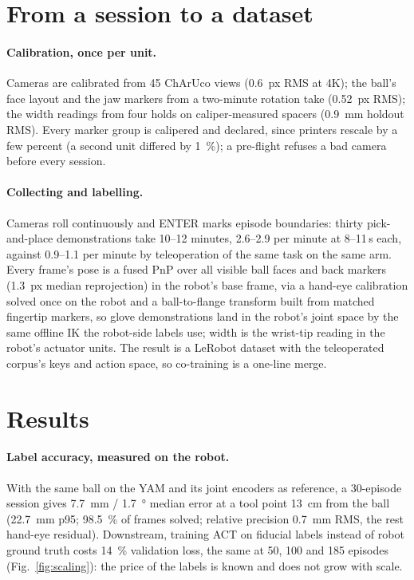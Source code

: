 \documentclass{article}
\begin{document}
\section{From a session to a dataset}
\label{sec:pipeline}
\paragraph{Calibration, once per unit.}
Cameras are calibrated from 45 ChArUco views (\SI{0.6}{px} RMS at 4K); the ball's face layout and the jaw markers from a two-minute rotation take (\SI{0.52}{px} RMS); the width readings from four holds on caliper-measured spacers (\SI{0.9}{mm} holdout RMS). Every marker group is calipered and declared, since printers rescale by a few percent (a second unit differed by \SI{1}{\percent}); a pre-flight refuses a bad camera before every session.

\paragraph{Collecting and labelling.}
Cameras roll continuously and ENTER marks episode boundaries: thirty pick-and-place demonstrations take 10--12 minutes, 2.6--2.9 per minute at 8--11\,s each, against 0.9--1.1 per minute by teleoperation of the same task on the same arm. Every frame's pose is a fused PnP over all visible ball faces and back markers (\SI{1.3}{px} median reprojection) in the robot's base frame, via a hand-eye calibration solved once on the robot and a ball-to-flange transform built from matched fingertip markers, so glove demonstrations land in the robot's joint space by the same offline IK the robot-side labels use; width is the wrist-tip reading in the robot's actuator units. The result is a LeRobot dataset with the teleoperated corpus's keys and action space, so co-training is a one-line merge.

\section{Results}
\label{sec:results}
\paragraph{Label accuracy, measured on the robot.}
With the same ball on the YAM and its joint encoders as reference, a 30-episode session gives \SI{7.7}{mm} / \SI{1.7}{\degree} median error at a tool point \SI{13}{cm} from the ball (\SI{22.7}{mm} p95; \SI{98.5}{\percent} of frames solved; relative precision \SI{0.7}{mm} RMS, the rest hand-eye residual). Downstream, training ACT on fiducial labels instead of robot ground truth costs \SI{+14}{\percent} validation loss, the same at 50, 100 and 185 episodes (Fig.~\ref{fig:scaling}): the price of the labels is known and does not grow with scale.
\end{document}

